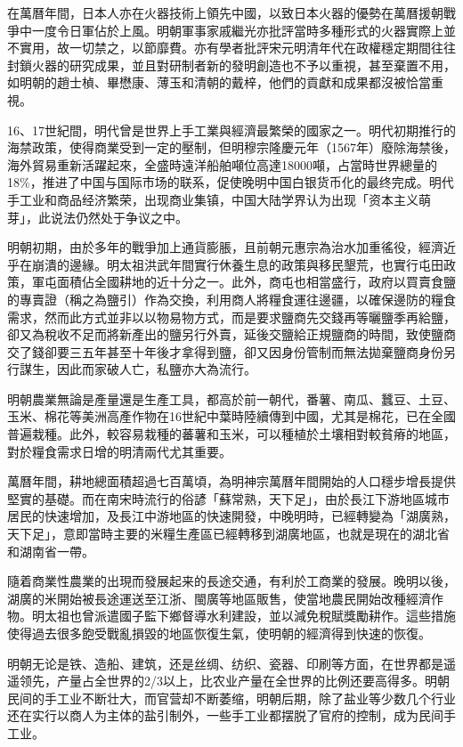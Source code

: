 在萬曆年間，日本人亦在火器技術上領先中國，以致日本火器的優勢在萬曆援朝戰爭中一度令日軍佔於上風。明朝軍事家戚繼光亦批評當時多種形式的火器實際上並不實用，故一切禁之，以節靡費。亦有學者批評宋元明清年代在政權穩定期間往往封鎖火器的研究成果，並且對研制者新的發明創造也不予以重視，甚至棄置不用，如明朝的趙士楨、畢懋康、薄玉和清朝的戴梓，他們的貢獻和成果都沒被恰當重視。

16、17世紀間，明代曾是世界上手工業與經濟最繁榮的國家之一。明代初期推行的海禁政策，使得商業受到一定的壓制，但明穆宗隆慶元年（1567年）廢除海禁後，海外貿易重新活躍起來，全盛時遠洋船舶噸位高達18000噸，占當時世界總量的18\%，推进了中国与国际市场的联系，促使晚明中国白银货币化的最终完成。明代手工业和商品经济繁荣，出现商业集镇，中国大陆学界认为出现「资本主义萌芽」，此说法仍然处于争议之中。

明朝初期，由於多年的戰爭加上通貨膨脹，且前朝元惠宗為治水加重徭役，經濟近乎在崩潰的邊緣。明太祖洪武年間實行休養生息的政策與移民墾荒，也實行屯田政策，軍屯面積佔全國耕地的近十分之一。此外，商屯也相當盛行，政府以買賣食鹽的專賣證（稱之為鹽引）作為交換，利用商人將糧食運往邊疆，以確保邊防的糧食需求，然而此方式並非以以物易物方式，而是要求鹽商先交錢再等曬鹽季再給鹽，卻又為稅收不足而將新產出的鹽另行外賣，延後交鹽給正規鹽商的時間，致使鹽商交了錢卻要三五年甚至十年後才拿得到鹽，卻又因身份管制而無法拋棄鹽商身份另行謀生，因此而家破人亡，私鹽亦大為流行。

明朝農業無論是產量還是生產工具，都高於前一朝代，番薯、南瓜、蠶豆、土豆、玉米、棉花等美洲高產作物在16世紀中葉時陸續傳到中國，尤其是棉花，已在全國普遍栽種。此外，較容易栽種的蕃薯和玉米，可以種植於土壤相對較貧瘠的地區，對於糧食需求日增的明清兩代尤其重要。

萬曆年間，耕地總面積超過七百萬頃，為明神宗萬曆年間開始的人口穩步增長提供堅實的基礎。而在南宋時流行的俗諺「蘇常熟，天下足」，由於長江下游地區城市居民的快速增加，及長江中游地區的快速開發，中晚明時，已經轉變為「湖廣熟，天下足」，意即當時主要的米糧生產區已經轉移到湖廣地區，也就是現在的湖北省和湖南省一帶。

隨着商業性農業的出現而發展起来的長途交通，有利於工商業的發展。晚明以後，湖廣的米開始被長途運送至江浙、閩廣等地區販售，使當地農民開始改種經濟作物。明太祖也曾派遣國子監下鄉督導水利建設，並以減免稅賦獎勵耕作。這些措施使得過去很多飽受戰亂損毀的地區恢復生氣，使明朝的經濟得到快速的恢復。

明朝无论是铁、造船、建筑，还是丝绸、纺织、瓷器、印刷等方面，在世界都是遥遥领先，产量占全世界的2/3以上，比农业产量在全世界的比例还要高得多。明朝民间的手工业不断壮大，而官营却不断萎缩，明朝后期，除了盐业等少数几个行业还在实行以商人为主体的盐引制外，一些手工业都摆脱了官府的控制，成为民间手工业。

